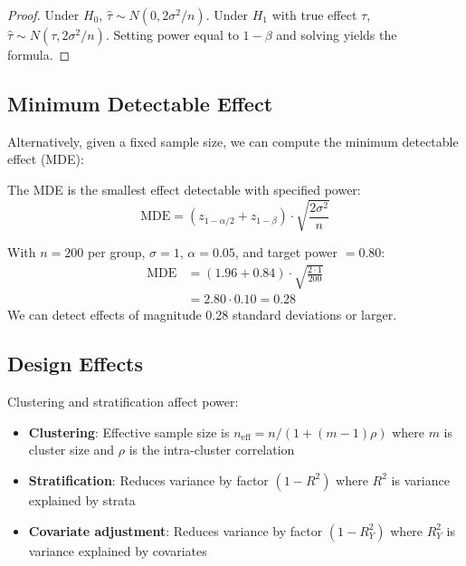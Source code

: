 \begin{proof}
Under $H_0$, $\hat{\tau} \sim N(0, 2\sigma^2/n)$. Under $H_1$ with true effect $\tau$, $\hat{\tau} \sim N(\tau, 2\sigma^2/n)$. Setting power equal to $1-\beta$ and solving yields the formula.
\end{proof}

\subsection{Minimum Detectable Effect}

Alternatively, given a fixed sample size, we can compute the minimum detectable effect (MDE):

\begin{definition}
\label{def:mde}
The MDE is the smallest effect detectable with specified power:
\begin{equation}
\text{MDE} = (z_{1-\alpha/2} + z_{1-\beta}) \cdot \sqrt{\frac{2\sigma^2}{n}}
\label{eq:mde}
\end{equation}
\end{definition}

\begin{example}
With $n = 200$ per group, $\sigma = 1$, $\alpha = 0.05$, and target power $= 0.80$:
\begin{align*}
\text{MDE} &= (1.96 + 0.84) \cdot \sqrt{\frac{2 \cdot 1}{200}} \\
&= 2.80 \cdot 0.10 = 0.28
\end{align*}
We can detect effects of magnitude 0.28 standard deviations or larger.
\end{example}

\subsection{Design Effects}

Clustering and stratification affect power:

\begin{itemize}
    \item \textbf{Clustering}: Effective sample size is $n_{\text{eff}} = n / (1 + (m-1)\rho)$ where $m$ is cluster size and $\rho$ is the intra-cluster correlation
    \item \textbf{Stratification}: Reduces variance by factor $(1 - R^2)$ where $R^2$ is variance explained by strata
    \item \textbf{Covariate adjustment}: Reduces variance by factor $(1 - R^2_Y)$ where $R^2_Y$ is variance explained by covariates
\end{itemize}



